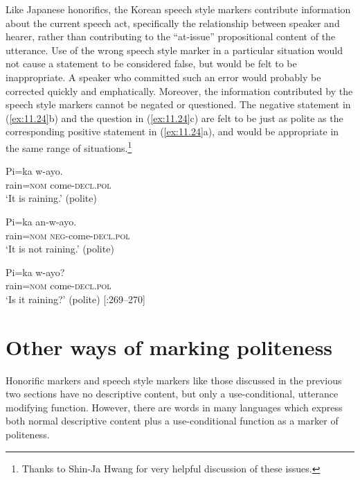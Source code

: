 Like Japanese honorifics, the Korean speech style markers contribute information about the current speech act, specifically the relationship between speaker and hearer, rather than contributing to the “at-issue” propositional content of the utterance. Use of the wrong speech style marker in a particular situation would not cause a statement to be considered false, but would be felt to be inappropriate. A speaker who committed such an error would probably be corrected quickly and emphatically. Moreover, the information contributed by the speech style markers cannot be negated or questioned. The negative statement in (\ref{ex:11.24}b) and the question in (\ref{ex:11.24}c) are felt to be just as polite as the corresponding positive statement in (\ref{ex:11.24}a), and would be appropriate in the same range of situations.\footnote{Thanks to Shin-Ja Hwang for very helpful discussion of these issues.}


\ea \label{ex:11.24} 
\ea  \gll Pi=ka  w-ayo.\\
rain=\textsc{nom}  come-\textsc{decl.pol}\\
\glt ‘It is raining.’ (polite)

\ex \gll Pi=ka  an-w-ayo.\\
rain=\textsc{nom}  \textsc{neg}-come-\textsc{decl.pol}\\
\glt ‘It is not raining.’ (polite)

\ex \gll  Pi=ka  w-ayo?\\
rain=\textsc{nom}  come-\textsc{decl.pol}\\
\glt ‘Is it raining?’ (polite)  [\citealt{Sohn1999}:269–270]
\z
\z

\section{Other ways of marking politeness}\label{sec:11.5}

Honorific markers and speech style markers like those discussed in the previous two sections have no descriptive content, but only a use-conditional, utterance modifying function. However, there are words in many languages which express both normal descriptive content plus a use-conditional function as a marker of politeness.



